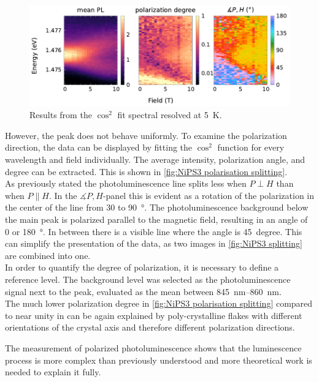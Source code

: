 \documentclass[
	twoside,
	parskip=half,
	a4paper,
]{scrbook}
\begin{document}
\begin{figure}
	\centering
	\includegraphics{../figures/2024-04-09 NiPS3 polarisation Splitting.pdf}
	\caption{Results from the $\cos^2$ fit spectral resolved at \SI{5}{K}.}
	\label{fig:NiPS3 polarisation splitting}
\end{figure}
However, the peak does not behave uniformly.
To examine the polarization direction, the data can be displayed by fitting the $\cos^2$ function for every wavelength and field individually.
The average intensity, polarization angle, and degree can be extracted.
This is shown in \autoref{fig:NiPS3 polarisation splitting}.\\
As previously stated the photoluminescence line splits less when $P\perp H$ than when $P\parallel H$.
In the $\measuredangle P, H$-panel this is evident as a rotation of the polarization in the center of the line from $30$ to \SI{90}{\degree}.
The photoluminescence background below the main peak is polarized parallel to the magnetic field, resulting in an angle of $0$ or \SI{180}{\degree}.
In between there is a visible line where the angle is \SI{45}{degree}.
This can simplify the presentation of the data, as two images in \autoref{fig:NiPS3 splitting} are combined into one.\\
In order to quantify the degree of polarization, it is necessary to define a reference level.
The background level was selected as the photoluminescence signal next to the peak, evaluated as the mean between \SIrange{845}{860}{nm}.\\
The much lower polarization degree in \autoref{fig:NiPS3 polarisation splitting} compared to near unity in \cite{NiPS3_anisotropic} can be again explained by poly-crystalline flakes with different orientations of the crystal axis and therefore different polarization directions.

The measurement of polarized photoluminescence shows that the luminescence process is more complex than previously understood and more theoretical work is needed to explain it fully.
\end{document}
